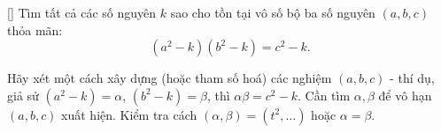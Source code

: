 \documentclass[../04-diophantine-equations.tex]{subfiles}
\begin{document}
\begin{exercise*}\label{example:RUS-2015-TST-D10-P3}[\textbf{}]
	Tìm tất cả các số nguyên \( k \) sao cho tồn tại vô số bộ ba số nguyên \( (a, b, c) \) thỏa mãn:
	\[
		(a^2 - k)(b^2 - k) = c^2 - k.
	\]
\end{exercise*}

\begin{remark*}
	Hãy xét một cách xây dựng (hoặc tham số hoá) các nghiệm \((a,b,c)\) - thí dụ, giả sử \((a^2-k)=\alpha\), \((b^2-k)=\beta\), thì \(\alpha\beta=c^2-k\).
	Cần tìm \(\alpha,\beta\) để vô hạn \((a,b,c)\) xuất hiện. Kiểm tra cách \((\alpha,\beta)=(t^2,\dots)\) hoặc \(\alpha=\beta\).
\end{remark*}

\end{document}

